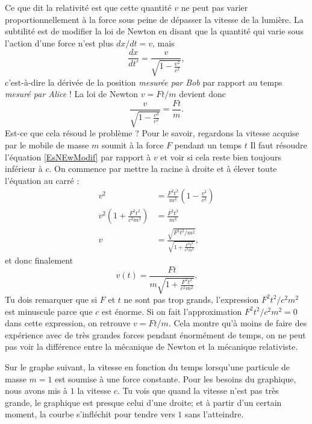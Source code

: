 Ce que dit la relativité est que cette quantité \( v\) ne peut pas varier proportionnellement à la force sous peine de dépasser la vitesse de la lumière. La subtilité est de modifier la loi de Newton en disant que la quantité qui varie sous l'action d'une force n'est plus \( dx/dt=v\), mais
\[
	\frac{ dx }{ dt' }=   \frac{ v }{ \sqrt{1-\frac{ v^2 }{ c^2 }} },
\]
c'est-à-dire la dérivée de la position \emph{mesurée par Bob} par rapport au temps \emph{mesuré par Alice} !  La loi de Newton \( v=Ft/m\) devient donc
\begin{equation}	\label{EsNEwModif}
	\frac{ v }{ \sqrt{1-\frac{ v^2 }{ c^2 }} }=\frac{ Ft }{ m }.
\end{equation}
Est-ce que cela résoud le problème ? Pour le savoir, regardons la vitesse acquise par le mobile de masse \( m\) soumit à la force \( F\) pendant un temps \( t\) Il faut résoudre l'équation \eqref{EsNEwModif} par rapport à \( v\) et voir si cela reste bien toujours inférieur à \( c\). On commence par mettre la racine à droite et à élever toute l'équation au carré :
\[
	\begin{split}
		v^2&=\frac{ F^2t^2 }{ m^2 }\left( 1-\frac{ v^2 }{ c^2 } \right)\\
		v^2\left( 1+\frac{ F^2t^2 }{ c^2m^2 } \right)&=\frac{ F^2t^2 }{ m^2 }\\
		v&=\frac{ \sqrt{F^2t^2/m^2} }{ \sqrt{1+\frac{ F^2t^2 }{ c^2m^2 }} },
	\end{split}
\]
et donc finalement
\begin{equation}	\label{EqVfntRel}
	v(t)=\frac{ Ft }{ m\sqrt{1+\frac{ F^2t^2 }{ c^2m^2 }} }.
\end{equation}
Tu dois remarquer que si \( F\) et \( t\) ne sont pas trop grands, l'expression \( F^2t^2/c^2m^2\) est minuscule parce que \( c\) est énorme. Si on fait l'approximation \( F^2t^2/c^2m^2=0\) dans cette expression, on retrouve \( v=Ft/m\). Cela montre qu'à moins de faire des expérience avec de très grandes forces pendant énormément de temps, on ne peut pas voir la différence entre la mécanique de Newton et la mécanique relativiste.

\begin{center}
	
\end{center}

Sur le graphe suivant, la vitesse en fonction du temps lorsqu'une particule de masse \( m=1\) est soumise à une force constante. Pour les besoins du graphique, nous avons mis à \( 1\) la vitesse \( c\). Tu vois que quand la vitesse n'est pas très grande, le graphique est presque celui d'une droite; et à partir d'un certain moment, la courbe s'infléchit pour tendre vers \( 1\) sans l'atteindre.

